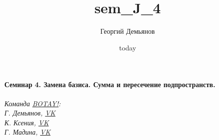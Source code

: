 \documentclass[a4paper,12pt]{article}
\title{sem_J_4}
\author{Георгий Демьянов}
\date{today}
\begin{document}
\paragraph{Семинар 4. Замена базиса. Сумма и пересечение подпространств.}



\begin{center}
	\vfill \emph{{\small Команда \href{https://vk.com/botay_fizteh}{BOTAY!}:\\
			Г. Демьянов, \href{https://vk.com/id37346992}{VK}\\
			К. Ксения, \href{https://vk.com/id143862366}{VK}\\
			Г. Мадина, \href{https://vk.com/id226312463}{VK}
	}}
\end{center}
\end{document}
